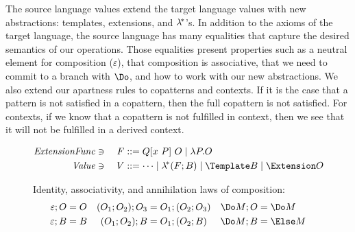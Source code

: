 The source language values extend the target language values with new abstractions: templates, extensions, and $\lambda^{\!*}$'s.
In addition to the axioms of the target language, the source language has many equalities that capture the desired semantics of our operations. Those equalities present properties such as a neutral element for composition ($\varepsilon$), that composition is associative, that we need to commit to a branch with $\Do$, and how to work with our new abstractions.
We also extend our apartness rules to copatterns and contexts.
If it is the case that a pattern is not satisfied in a copattern, then the full copattern is not satisfied.
For contexts, if we know that a copattern is not fulfilled in context, then we see that it will not be fulfilled in a derived context.

\begin{figure}
\centering

\begin{alignat*}{2}
  \mathit{ExtensionFunc} &\ni{}& F
  &::= Q[x ~ P] ~ O
  \mid \lambda P. O
  \\
  \mathit{Value} &\ni{}& V
  &::= \dots
  \mid \lamstar (F; B)
  \mid \Template B
  \mid \Extension O
  \\
\end{alignat*}

Identity, associativity, and annihilation laws of composition:
\begin{align*}
  \varepsilon; O &= O %
  &
  (O_1; O_2); O_3 &= O_1; (O_2; O_3)
  &
  \Do M; O &= \Do M
  \\
  \varepsilon; B &= B
  &
  (O_1; O_2); B &= O_1; (O_2; B)
  &
  \Do M; B &= \Else M
\end{align*}


\end{figure}

